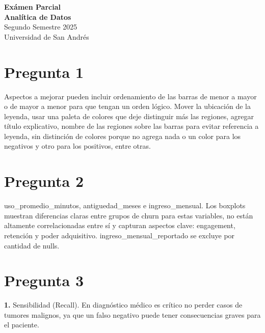 \documentclass[12pt]{article}
\begin{document}

\begin{center}
    {\LARGE \textbf{Exámen Parcial\\[0.5em]Analítica de Datos}}\\[0.5em]
    {Segundo Semestre 2025}\\[0.5em]
    {Universidad de San Andrés}
\end{center}

\section{Pregunta 1}

Aspectos a mejorar pueden incluir ordenamiento de las barras de menor a mayor o de mayor a menor para que tengan un orden lógico. Mover la ubicación de la leyenda, usar una paleta de colores que deje distinguir más las regiones, agregar título explicativo, nombre de las regiones sobre las barras para evitar referencia a leyenda, sin distinción de colores porque no agrega nada o un color para los negativos y otro para los positivos, entre otras.

\section{Pregunta 2}

uso\_promedio\_minutos, antiguedad\_meses e ingreso\_mensual. Los boxplots muestran diferencias claras entre grupos de churn para estas variables, no están altamente correlacionadas entre sí y capturan aspectos clave: engagement, retención y poder adquisitivo. ingreso\_mensual\_reportado se excluye por cantidad de nulls.

\section{Pregunta 3}

\textbf{1.} Sensibilidad (Recall). En diagnóstico médico es crítico no perder casos de tumores malignos, ya que un falso negativo puede tener consecuencias graves para el paciente.
\end{document}
